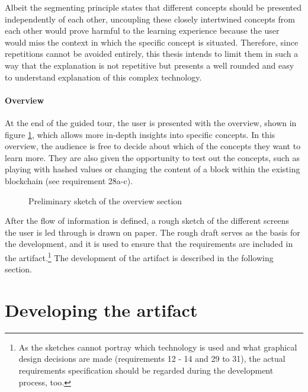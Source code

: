 Albeit the segmenting principle states that different concepts should be presented independently of each other, uncoupling these closely intertwined concepts from each other would prove harmful to the learning experience because the user would miss the context in which the specific concept is situated. Therefore, since repetitions cannot be avoided entirely, this thesis intends to limit them in such a way that the explanation is not repetitive but presents a well rounded and easy to understand explanation of this complex technology.

\paragraph{Overview} At the end of the guided tour, the user is presented with the overview, shown in figure \ref{fig:OverviewPic}, which allows more in-depth insights into specific concepts.
In this overview, the audience is free to decide about which of the concepts they want to learn more. They are also given the opportunity to test out the concepts, such as playing with hashed values or changing the content of a block within the existing blockchain (see requirement 28a-c).

\begin{figure}
    \centering
    
    \caption{Preliminary sketch of the overview section}
    \label{fig:OverviewPic}
\end{figure}

After the flow of information is defined, a rough sketch of the different screens the user is led through is drawn on paper. The rough draft serves as the basis for the development, and it is used to ensure that the requirements are included in the artifact.\footnote{As the sketches cannot portray which technology is used and what graphical design decisions are made (requirements 12 - 14 and 29 to 31), the actual requirements specification should be regarded during the development process, too.} The development of the artifact is described in the following section.

\section{Developing the artifact}

